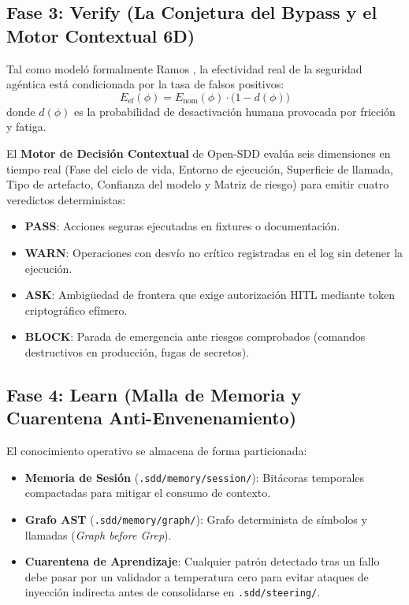 \documentclass[11pt,a4paper]{article}
\begin{document}
\subsection{Fase 3: Verify (La Conjetura del Bypass y el Motor Contextual 6D)}
Tal como modeló formalmente Ramos \cite{ramos2026zero}, la efectividad real de la seguridad agéntica está condicionada por la tasa de falsos positivos:
\begin{equation}
    E_{\text{ef}}(\phi) = E_{\text{nom}}(\phi)\cdot \bigl(1 - d(\phi)\bigr)
\end{equation}
donde $d(\phi)$ es la probabilidad de desactivación humana provocada por fricción y fatiga.

El \textbf{Motor de Decisión Contextual} de Open-SDD evalúa seis dimensiones en tiempo real (Fase del ciclo de vida, Entorno de ejecución, Superficie de llamada, Tipo de artefacto, Confianza del modelo y Matriz de riesgo) para emitir cuatro veredictos deterministas:
\begin{itemize}
    \item \textbf{PASS}: Acciones seguras ejecutadas en fixtures o documentación.
    \item \textbf{WARN}: Operaciones con desvío no crítico registradas en el log sin detener la ejecución.
    \item \textbf{ASK}: Ambigüedad de frontera que exige autorización HITL mediante token criptográfico efímero.
    \item \textbf{BLOCK}: Parada de emergencia ante riesgos comprobados (comandos destructivos en producción, fugas de secretos).
\end{itemize}

\subsection{Fase 4: Learn (Malla de Memoria y Cuarentena Anti-Envenenamiento)}
El conocimiento operativo se almacena de forma particionada:
\begin{itemize}
    \item \textbf{Memoria de Sesión} (\texttt{.sdd/memory/session/}): Bitácoras temporales compactadas para mitigar el consumo de contexto.
    \item \textbf{Grafo AST} (\texttt{.sdd/memory/graph/}): Grafo determinista de símbolos y llamadas (\textit{Graph before Grep}).
    \item \textbf{Cuarentena de Aprendizaje}: Cualquier patrón detectado tras un fallo debe pasar por un validador a temperatura cero para evitar ataques de inyección indirecta antes de consolidarse en \texttt{.sdd/steering/}.
\end{itemize}
\end{document}
